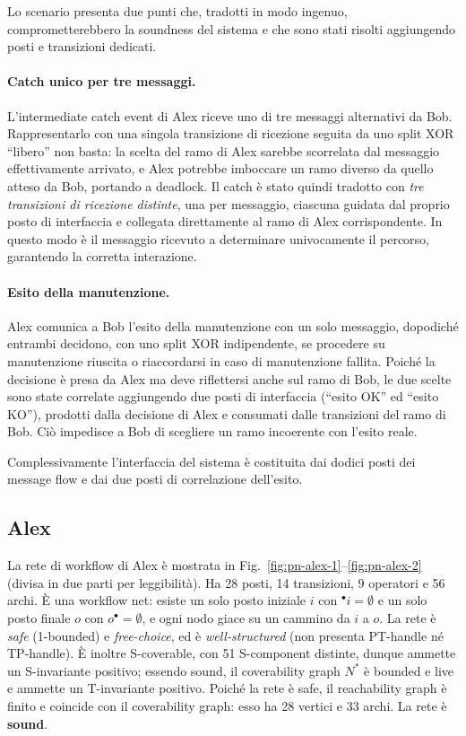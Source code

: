 \documentclass[11pt,a4paper]{article}
\newcommand{\preset}[1]{{}^{\bullet}#1}
\newcommand{\postset}[1]{#1^{\bullet}}
\newcommand{\net}{\ensuremath{N}}
\begin{document}
Lo scenario presenta due punti che, tradotti in modo ingenuo, comprometterebbero la
soundness del sistema e che sono stati risolti aggiungendo posti e transizioni
dedicati.

\paragraph{Catch unico per tre messaggi.} L'intermediate catch event di Alex riceve
uno di tre messaggi alternativi da Bob. Rappresentarlo con una singola transizione
di ricezione seguita da uno split XOR ``libero'' non basta: la scelta del ramo di Alex
sarebbe scorrelata dal messaggio effettivamente arrivato, e Alex potrebbe imboccare un
ramo diverso da quello atteso da Bob, portando a deadlock. Il catch \`e stato quindi
tradotto con \emph{tre transizioni di ricezione distinte}, una per messaggio, ciascuna
guidata dal proprio posto di interfaccia e collegata direttamente al ramo di Alex
corrispondente. In questo modo \`e il messaggio ricevuto a determinare univocamente il
percorso, garantendo la corretta interazione.

\paragraph{Esito della manutenzione.} Alex comunica a Bob l'esito della manutenzione
con un solo messaggio, dopodich\'e entrambi decidono, con uno split XOR indipendente,
se procedere su manutenzione riuscita o riaccordarsi in caso di manutenzione fallita. Poich\'e la
decisione \`e presa da Alex ma deve riflettersi anche sul ramo di Bob, le due scelte
sono state correlate aggiungendo due posti di interfaccia (``esito OK'' ed ``esito
KO''), prodotti dalla decisione di Alex e consumati dalle transizioni del ramo di Bob.
Ci\`o impedisce a Bob di scegliere un ramo incoerente con l'esito reale.

Complessivamente l'interfaccia del sistema \`e costituita dai dodici posti dei message
flow e dai due posti di correlazione dell'esito.

\subsection{Alex}
La rete di workflow di Alex \`e mostrata in Fig.~\ref{fig:pn-alex-1}--\ref{fig:pn-alex-2}
(divisa in due parti per leggibilit\`a). Ha 28 posti,
14 transizioni, 9 operatori e 56 archi. \`E una workflow net: esiste un solo posto
iniziale $i$ con $\preset{i}=\emptyset$ e un solo posto finale $o$ con
$\postset{o}=\emptyset$, e ogni nodo giace su un cammino da $i$ a $o$. La rete \`e
\emph{safe} (1-bounded) e \emph{free-choice}, ed \`e \emph{well-structured} (non
presenta PT-handle n\'e TP-handle). \`E inoltre S-coverable, con 51 S-component
distinte, dunque ammette un S-invariante positivo; essendo sound, il coverability graph $\net^{*}$ \`e bounded e live e ammette un T-invariante positivo. Poich\'e
la rete \`e safe, il reachability graph \`e finito e coincide con il coverability graph:
 esso ha 28 vertici e 33 archi. La rete \`e \textbf{sound}.
\end{document}
